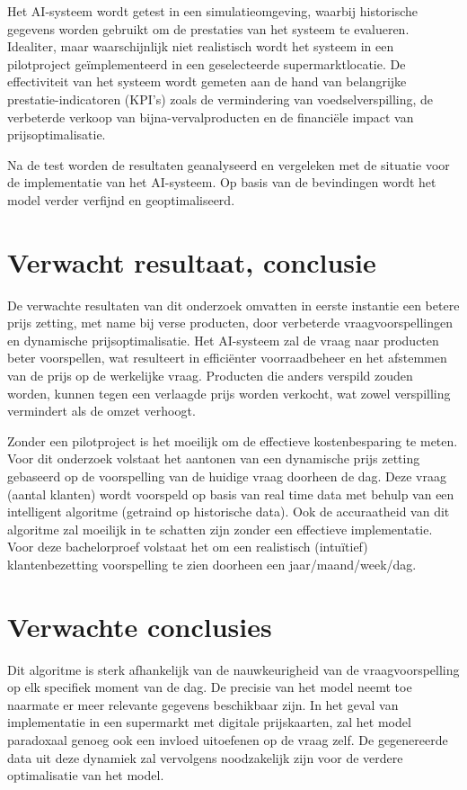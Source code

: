 Het AI-systeem wordt getest in een simulatieomgeving,
waarbij historische gegevens worden gebruikt om de prestaties van het systeem te evalueren.
Idealiter, maar waarschijnlijk niet realistisch wordt het systeem in een pilotproject geïmplementeerd in een geselecteerde supermarktlocatie.
De effectiviteit van het systeem wordt gemeten aan de hand van belangrijke prestatie-indicatoren (KPI's) zoals de vermindering van voedselverspilling,
de verbeterde verkoop van bijna-vervalproducten en de financiële impact van prijsoptimalisatie.

Na de test worden de resultaten geanalyseerd en vergeleken met de situatie voor de implementatie van het AI-systeem.
Op basis van de bevindingen wordt het model verder verfijnd en geoptimaliseerd.


\section{Verwacht resultaat, conclusie}%
\label{sec:verwachte_resultaten}
De verwachte resultaten van dit onderzoek omvatten in eerste instantie een betere prijs zetting,
met name bij verse producten, door verbeterde vraagvoorspellingen en dynamische prijsoptimalisatie.
Het AI-systeem zal de vraag naar producten beter voorspellen,
wat resulteert in efficiënter voorraadbeheer en het afstemmen van de prijs op de werkelijke vraag.
Producten die anders verspild zouden worden, kunnen tegen een verlaagde prijs worden verkocht,
wat zowel verspilling vermindert als de omzet verhoogt.

Zonder een pilotproject is het moeilijk om de effectieve kostenbesparing te meten.
Voor dit onderzoek volstaat het aantonen van een dynamische prijs zetting gebaseerd op de voorspelling van de huidige vraag doorheen de dag.
Deze vraag (aantal klanten) wordt voorspeld op basis van real time data met behulp van een intelligent algoritme (getraind op historische data).
Ook de accuraatheid van dit algoritme zal moeilijk in te schatten zijn zonder een effectieve implementatie.
Voor deze bachelorproef volstaat het om een realistisch (intuïtief) klantenbezetting voorspelling te zien doorheen een jaar/maand/week/dag.

\section{Verwachte conclusies}
\label{sec:verwachte_conclusies}

Dit algoritme is sterk afhankelijk van de nauwkeurigheid van de vraagvoorspelling op elk specifiek moment van de dag. De precisie van het model neemt toe naarmate er meer relevante gegevens beschikbaar zijn. In het geval van implementatie in een supermarkt met digitale prijskaarten, zal het model paradoxaal genoeg ook een invloed uitoefenen op de vraag zelf. De gegenereerde data uit deze dynamiek zal vervolgens noodzakelijk zijn voor de verdere optimalisatie van het model.